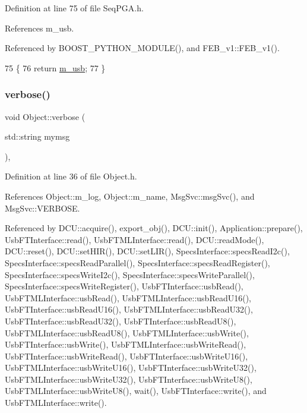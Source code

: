 Definition at line 75 of file Seq\+P\+G\+A.\+h.



References m\+\_\+usb.



Referenced by B\+O\+O\+S\+T\+\_\+\+P\+Y\+T\+H\+O\+N\+\_\+\+M\+O\+D\+U\+L\+E(), and F\+E\+B\+\_\+v1\+::\+F\+E\+B\+\_\+v1().


\begin{DoxyCode}
75                          \{
76     \textcolor{keywordflow}{return} \hyperlink{classSeqPGA_a3df81bbe0e75a1287aa6fe9d33ea27f5}{m\_usb};
77   \}
\end{DoxyCode}
\mbox{\label{classObject_a83d2db2df682907ea1115ad721c1c4a1}} 
\subsubsection{\texorpdfstring{verbose()}{verbose()}\hspace{0.1cm}{\footnotesize\ttfamily [1/2]}}
{\footnotesize\ttfamily void Object\+::verbose (\begin{DoxyParamCaption}\item[{std\+::string}]{mymsg }\end{DoxyParamCaption})\hspace{0.3cm}{\ttfamily [inline]}, {\ttfamily [inherited]}}



Definition at line 36 of file Object.\+h.



References Object\+::m\+\_\+log, Object\+::m\+\_\+name, Msg\+Svc\+::msg\+Svc(), and Msg\+Svc\+::\+V\+E\+R\+B\+O\+SE.



Referenced by D\+C\+U\+::acquire(), export\+\_\+obj(), D\+C\+U\+::init(), Application\+::prepare(), Usb\+F\+T\+Interface\+::read(), Usb\+F\+T\+M\+L\+Interface\+::read(), D\+C\+U\+::read\+Mode(), D\+C\+U\+::reset(), D\+C\+U\+::set\+H\+I\+R(), D\+C\+U\+::set\+L\+I\+R(), Specs\+Interface\+::specs\+Read\+I2c(), Specs\+Interface\+::specs\+Read\+Parallel(), Specs\+Interface\+::specs\+Read\+Register(), Specs\+Interface\+::specs\+Write\+I2c(), Specs\+Interface\+::specs\+Write\+Parallel(), Specs\+Interface\+::specs\+Write\+Register(), Usb\+F\+T\+Interface\+::usb\+Read(), Usb\+F\+T\+M\+L\+Interface\+::usb\+Read(), Usb\+F\+T\+M\+L\+Interface\+::usb\+Read\+U16(), Usb\+F\+T\+Interface\+::usb\+Read\+U16(), Usb\+F\+T\+M\+L\+Interface\+::usb\+Read\+U32(), Usb\+F\+T\+Interface\+::usb\+Read\+U32(), Usb\+F\+T\+Interface\+::usb\+Read\+U8(), Usb\+F\+T\+M\+L\+Interface\+::usb\+Read\+U8(), Usb\+F\+T\+M\+L\+Interface\+::usb\+Write(), Usb\+F\+T\+Interface\+::usb\+Write(), Usb\+F\+T\+M\+L\+Interface\+::usb\+Write\+Read(), Usb\+F\+T\+Interface\+::usb\+Write\+Read(), Usb\+F\+T\+Interface\+::usb\+Write\+U16(), Usb\+F\+T\+M\+L\+Interface\+::usb\+Write\+U16(), Usb\+F\+T\+Interface\+::usb\+Write\+U32(), Usb\+F\+T\+M\+L\+Interface\+::usb\+Write\+U32(), Usb\+F\+T\+Interface\+::usb\+Write\+U8(), Usb\+F\+T\+M\+L\+Interface\+::usb\+Write\+U8(), wait(), Usb\+F\+T\+Interface\+::write(), and Usb\+F\+T\+M\+L\+Interface\+::write().


